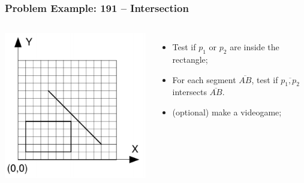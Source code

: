 \begin{frame}
  \frametitle{Problem Example: 191 -- Intersection}

  \begin{columns}
    \includegraphics[width=\textwidth]{img/intersection_uva}

    \begin{itemize}
      \item Test if $p_1$ or $p_2$ are inside the rectangle;
      \item For each segment $\overline{AB}$, test if $\overline{p_1,p_2}$ intersects $\overline{AB}$.\bigskip

      \item (optional) make a videogame;
    \end{itemize}
  \end{columns}
\end{frame}

